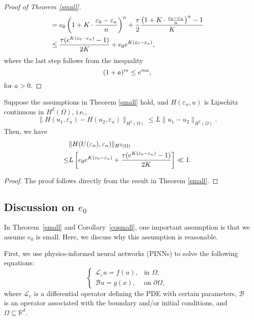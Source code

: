 \begin{proof}[Proof of Theorem \ref{small}]
\begin{align}
        &= e_0\left(1+K\cdot \frac{\varepsilon_0-\varepsilon_n}{n}\right)^n+\frac{\tau}{2} \frac{\left(1+K\cdot \frac{\varepsilon_0-\varepsilon_n}{n}\right)^n-1}{K} \notag \\
        &\leq \frac{\tau(e^{K(\varepsilon_0-\varepsilon_n)}-1)}{2K}+e_0e^{K(\varepsilon_0-\varepsilon_n)},
    \end{align}
    where the last step follows from the inequality  
    \begin{equation}
    (1+a)^m \leq e^{m a}, \notag
    \end{equation}
    for \( a>0 \).
\end{proof}

\begin{corollary}\label{cosmall}
    Suppose the assumptions in Theorem \ref{small} hold, and \( H(\varepsilon_n, u) \) is Lipschitz continuous in \( H^2(\Omega) \), i.e.,
    \[
    \|H( u_1,\varepsilon_n) - H( u_2,\varepsilon_n)\|_{H^2(\Omega)} \leq L \|u_1 - u_2\|_{H^2(\Omega)}.
    \]
    Then, we have  
    \begin{align}
        &\|H( U(\varepsilon_n),\varepsilon_n)\|_{H^2(\Omega)} \notag\\\leq& L\left[e_0e^{K(\varepsilon_0-\varepsilon_n)}+\frac{\tau(e^{K(\varepsilon_0-\varepsilon_n)}-1)}{2K}\right] \ll 1.
    \end{align}
\end{corollary}

\begin{proof}
    The proof follows directly from the result in Theorem \ref{small}.
\end{proof}

\subsection{Discussion on \( e_0 \)}\label{e0}

In Theorem~\ref{small} and Corollary~\ref{cosmall}, one important assumption is that we assume \( e_0 \) is small. Here, we discuss why this assumption is reasonable. 

First, we use physics-informed neural networks (PINNs) to solve the following equations:
\begin{equation}
\left\{
\begin{array}{ll}
\mathcal{L}_\varepsilon u = f(u), & \text{in } \Omega, \\
\mathcal{B} u = g(x), & \text{on } \partial \Omega,
\end{array}
\right.
\label{eq:gen_pde1}
\end{equation}
where \( \mathcal{L}_\varepsilon \) is a differential operator defining the PDE with certain parameters, \( \mathcal{B} \) is an operator associated with the boundary and/or initial conditions, and \( \Omega \subseteq \mathbb{R}^d \).

